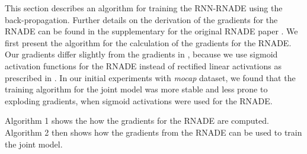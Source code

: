 \documentclass{article} %
\begin{document}
This section describes an algorithm for training the RNN-RNADE using the back-propagation. Further details on the derivation of the gradients for the RNADE can be found in the supplementary for the original RNADE paper \cite{Uria2013}. We first present the algorithm for the calculation of the gradients for the RNADE. Our gradients differ slightly from the gradients in \cite{Uria2013}, because we use sigmoid activation functions for the RNADE instead of rectified linear activations as prescribed in \cite{Uria2013}. In our initial experiments with \textit{mocap} dataset, we found that the training algorithm for the joint model was more stable and less prone to exploding gradients, when sigmoid activations were used for the RNADE. 

Algorithm 1 shows the how the gradients for the RNADE are computed. Algorithm 2 then shows how the gradients from the RNADE can be used to train the joint model. 
\end{document}
